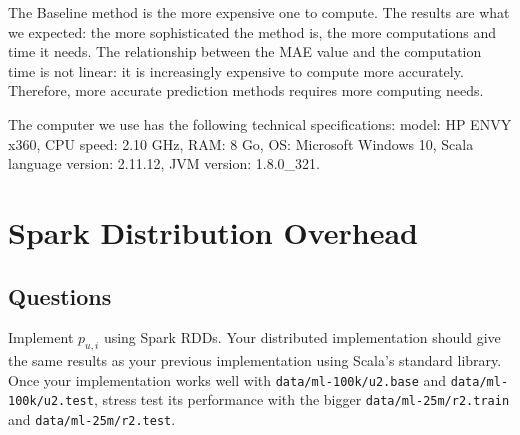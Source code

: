 \documentclass{article}
\begin{document}
\begin{itemize}
 The Baseline method is the more expensive one to compute. The results are what we expected: the more sophisticated the method is, the more computations and time it needs. The relationship between the MAE value and the computation time is not linear: it is increasingly expensive to compute more accurately. Therefore, more accurate prediction methods requires more computing needs.
 
 The computer we use has the following technical specifications: model: HP ENVY x360, CPU speed: 2.10 GHz, RAM: 8 Go, OS: Microsoft Windows 10, Scala language version: 2.11.12,  JVM version: 1.8.0\_321.

\end{itemize}

\section{Spark Distribution Overhead}

\subsection{Questions}
\label{section:q5}

Implement $p_{u,i}$ using Spark RDDs. Your distributed implementation should give the same results as your previous implementation using Scala's standard library. Once your implementation works well with \texttt{data/ml-100k/u2.base} and \texttt{data/ml-100k/u2.test}, stress test its performance with the bigger \newline \texttt{data/ml-25m/r2.train} and \texttt{data/ml-25m/r2.test}. 
\end{document}
